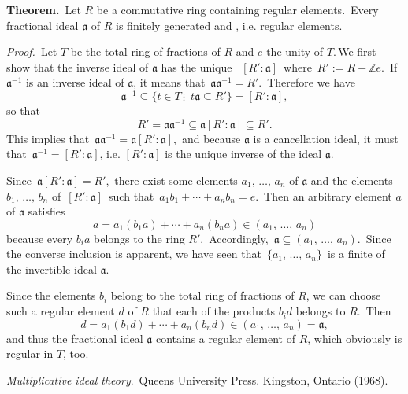 \documentclass[12pt]{article}
\theoremstyle{definition}
\begin{document}
\textbf{Theorem.}\, Let $R$ be a commutative ring containing regular elements.\, Every  fractional ideal $\mathfrak{a}$ of $R$ is finitely generated and , i.e.  regular elements.


{\it Proof.}\, Let $T$ be the total ring of fractions of $R$ and $e$ the unity of $T$.\,We first show that the inverse ideal of $\mathfrak{a}$ has the unique \, $[R':\mathfrak{a}]$\, where\, $R' := R+\mathbb{Z}e$.\, If $\mathfrak{a}^{-1}$ is an inverse ideal of $\mathfrak{a}$, it means that\, $\mathfrak{aa}^{-1} = R'$.\, Therefore we have
  $$\mathfrak{a}^{-1} \subseteq \{t\in T\,\vdots \,\,\, t\mathfrak{a}\subseteq R'\} = [R'\!:\!\mathfrak{a}],$$
so that
  $$R' = \mathfrak{aa}^{-1} \subseteq \mathfrak{a}[R'\!:\!\mathfrak{a}]
         \subseteq R'.$$
This implies that\, $\mathfrak{aa}^{-1} = \mathfrak{a}[R'\!:\!\mathfrak{a}]$,\, and because $\mathfrak{a}$ is a cancellation ideal, it must  that\, $\mathfrak{a}^{-1} = [R'\!:\!\mathfrak{a}]$, i.e. $[R'\!:\!\mathfrak{a}]$ is the unique inverse of the ideal $\mathfrak{a}$.\, 

Since\, $\mathfrak{a}[R'\!:\!\mathfrak{a}] = R'$,\, there exist some elements $a_1,\,\ldots,\,a_n$ of $\mathfrak{a}$ and the elements $b_1,\,\ldots,\,b_n$ of\, $[R'\!:\!\mathfrak{a}]$\, such that\, $a_1b_1\!+\cdots+\!a_nb_n = e$.\, Then an arbitrary element $a$ of $\mathfrak{a}$ satisfies
  $$a = a_1(b_1a)\!+\cdots+\!a_n(b_na) \in (a_1,\,\ldots,\,a_n)$$
because every $b_ia$ belongs to the ring $R'$.\, Accordingly,\, 
$\mathfrak{a} \subseteq (a_1,\,\ldots,\,a_n)$.\, Since the converse inclusion is apparent, we have seen that\, $\{a_1,\,\ldots,\,a_n\}$\, is a finite  of the invertible ideal $\mathfrak{a}$.

Since the elements $b_i$ belong to the total ring of fractions of $R$, we can choose such a regular element $d$ of $R$ that each of the products $b_id$ belongs to $R$.\, Then
 $$d = a_1(b_1d)\!+\cdots+\!a_n(b_nd) \in (a_1,\,\ldots,\,a_n) = \mathfrak{a},$$
and thus the fractional ideal $\mathfrak{a}$ contains a regular element of $R$, which obviously is regular in $T$, too.

\begin{thebibliography}{9}
  {\em Multiplicative ideal theory}.\, Queens University Press. Kingston, Ontario (1968).
\end{thebibliography}
\end{document}

